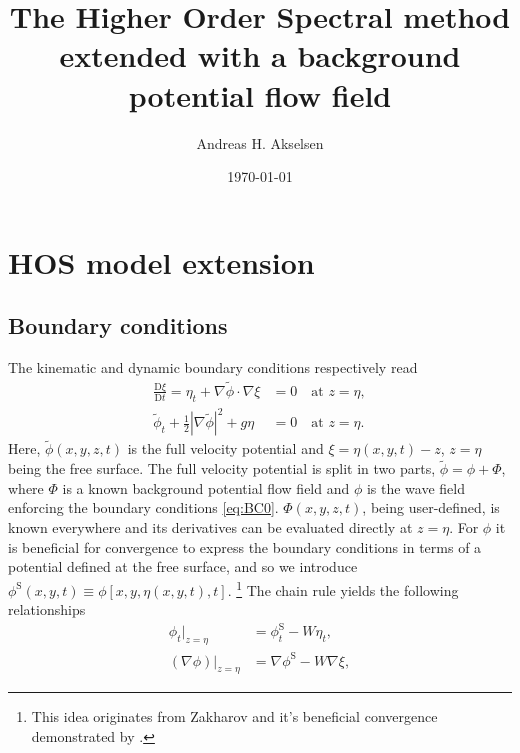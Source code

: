 \documentclass[a4paper,12pt]{article}
\newcommand{\mr}{\mathrm}
\renewcommand{\S}{^\mr{S}}
\newcommand{\phit}{\tilde\phi}
\begin{document}
\title{The Higher Order Spectral method extended with a background potential flow field}
\author{Andreas H. Akselsen}
\date{\today}
\maketitle

\section{HOS model extension}
\subsection{Boundary conditions}
The kinematic and dynamic boundary conditions respectively read
\begin{subequations}
\begin{align}
\frac{\mr D \xi}{\mr D t}  = \eta_t + \nabla \phit \cdot\nabla \xi &= 0  \quad \text{at }z = \eta, 
\\
\phit_t + \frac12|\nabla\phit|^2 + g\eta &= 0  \quad  \text{at }z = \eta.
\end{align}%
\label{eq:BC0}%
\end{subequations}%
Here, $\phit(x,y,z,t)$ is the full velocity potential and $\xi = \eta(x,y,t)-z$, $z = \eta$ being the free surface.
The full velocity potential is split in two parts, $\phit = \phi + \Phi$, where $\Phi$ is a known background potential flow field and $\phi$ is the wave field enforcing the boundary conditions \eqref{eq:BC0}.
$\Phi(x,y,z,t)$, being user-defined, is known everywhere and its derivatives can be evaluated directly at $z=\eta$.
For $\phi$ it is beneficial for convergence to express the boundary conditions in terms of a potential defined at the free surface, and so we introduce 
$\phi\S(x,y,t) \equiv \phi[x,y,\eta(x,y,t),t]$.%
\footnote{This idea originates from Zakharov and it's beneficial convergence demonstrated by \citet{west1981deep}.}
The chain rule yields the following relationships
\begin{align*}
\phi_t\big|_{z=\eta} &= \phi_t\S - W\eta_t,\\
(\nabla\phi)\big|_{z=\eta}  &= \nabla\phi\S - W\nabla\xi , 
\end{align*}
\end{document}

